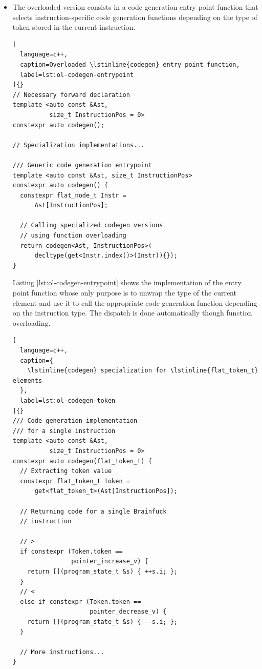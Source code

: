 \documentclass[../main]{subfiles}
\begin{document}
\begin{itemize}
\item
The overloaded version consists in a code generation entry point function
that selects instruction-specific code generation functions depending
on the type of token stored in the current instruction.

\begin{lstlisting}[
  language=c++,
  caption=Overloaded \lstinline{codegen} entry point function,
  label=lst:ol-codegen-entrypoint
]{}
// Necessary forward declaration
template <auto const &Ast,
          size_t InstructionPos = 0>
constexpr auto codegen();

// Specialization implementations...

/// Generic code generation entrypoint
template <auto const &Ast, size_t InstructionPos>
constexpr auto codegen() {
  constexpr flat_node_t Instr =
      Ast[InstructionPos];

  // Calling specialized codegen versions
  // using function overloading
  return codegen<Ast, InstructionPos>(
      decltype(get<Instr.index()>(Instr)){});
}
\end{lstlisting}

Listing \ref{lst:ol-codegen-entrypoint} shows the implementation
of the entry point function whose only purpose is to unwrap the type
of the current element and use it to call the appropriate code generation
function depending on the instruction type.
The dispatch is done automatically though function overloading.

\begin{lstlisting}[
  language=c++,
  caption={
    \lstinline{codegen} specialization for \lstinline{flat_token_t} elements
  },
  label=lst:ol-codegen-token
]{}
/// Code generation implementation
/// for a single instruction
template <auto const &Ast,
          size_t InstructionPos = 0>
constexpr auto codegen(flat_token_t) {
  // Extracting token value
  constexpr flat_token_t Token =
      get<flat_token_t>(Ast[InstructionPos]);

  // Returning code for a single Brainfuck
  // instruction

  // >
  if constexpr (Token.token ==
                pointer_increase_v) {
    return [](program_state_t &s) { ++s.i; };
  }
  // <
  else if constexpr (Token.token ==
                     pointer_decrease_v) {
    return [](program_state_t &s) { --s.i; };
  }

  // More instructions...
}
\end{lstlisting}


\end{itemize}
\end{document}

